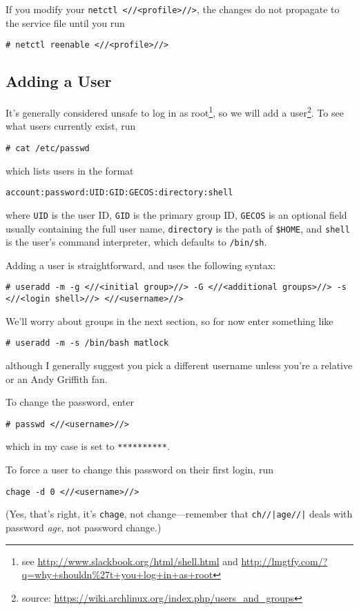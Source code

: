 \documentclass[12pt,letterpaper]{article}
\begin{document}
If you modify your \lstinline{netctl <//<profile>//>}, the changes do not propagate to the service file until you run
\begin{lstlisting}
# netctl reenable <//<profile>//>
\end{lstlisting}

\subsection{Adding a User}

It's generally considered unsafe to log in as root\footnote{see \url{http://www.slackbook.org/html/shell.html} and \url{http://lmgtfy.com/?q=why+shouldn\%27t+you+log+in+as+root}}, so we will add a user\footnote{source: \url{https://wiki.archlinux.org/index.php/users_and_groups}}.  To see what users currently exist, run

\begin{lstlisting}
# cat /etc/passwd
\end{lstlisting}
which lists users in the format
\begin{lstlisting}
account:password:UID:GID:GECOS:directory:shell
\end{lstlisting}
where \lstinline{UID} is the user ID, \lstinline{GID} is the primary group ID, \lstinline{GECOS} is an optional field usually containing the full user name, \lstinline{directory} is the path of \lstinline{$HOME}, and \lstinline{shell} is the user's command interpreter, which defaults to \lstinline{/bin/sh}.

Adding a user is straightforward, and uses the following syntax:

\begin{lstlisting}
# useradd -m -g <//<initial group>//> -G <//<additional groups>//> -s <//<login shell>//> <//<username>//>
\end{lstlisting}
We'll worry about groups in the next section, so for now enter something like
\begin{lstlisting}
# useradd -m -s /bin/bash matlock
\end{lstlisting}
although I generally suggest you pick a different username unless you're a relative or an Andy Griffith fan.

To change the password, enter
\begin{lstlisting}
# passwd <//<username>//>
\end{lstlisting}
which in my case is set to \lstinline{**********}.

To force a user to change this password on their first login, run
\begin{lstlisting}
chage -d 0 <//<username>//>
\end{lstlisting}
(Yes, that's right, it's \lstinline{chage}, not change---remember that \lstinline{ch//|age//|} deals with password \emph{age}, not password change.)
\end{document}
